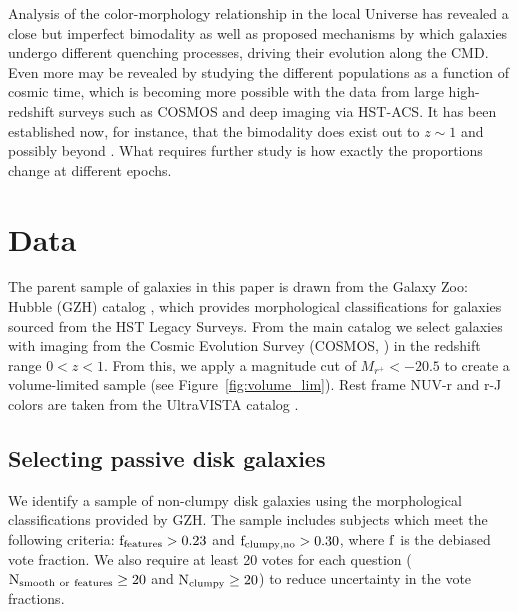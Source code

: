 \documentclass[useAMS,usenatbib]{mn2e}
\begin{document}
Analysis of the color-morphology relationship in the local Universe has revealed a close but imperfect bimodality as well as proposed mechanisms by which galaxies undergo different quenching processes, driving their evolution along the CMD. Even more may be revealed by studying the different populations as a function of cosmic time, which is becoming more possible with the data from large high-redshift surveys such as COSMOS and deep imaging via HST-ACS. It has been established now, for instance, that the bimodality does exist out to $z\sim1$ \citep{Bell2004,Cirasuolo2007,Mignoli2009} and possibly beyond \citep{Giallongo2005,VanDokkum2006,Franzetti2007,Cassata2008}. What requires further study is how exactly the proportions change at different epochs.


\section{Data}
\label{sec:Data}

The parent sample of galaxies in this paper is drawn from the Galaxy Zoo: Hubble (GZH) catalog \citep{Willett2016}, which provides morphological classifications for galaxies sourced from the HST Legacy Surveys. From the main catalog we select galaxies with imaging from the Cosmic Evolution Survey (COSMOS, \citet{Scoville2007}) in the redshift range $0<z<1$. From this, we apply a magnitude cut of $M_{r^{+}}<-20.5$ to create a volume-limited sample (see Figure~\ref{fig:volume_lim}). Rest frame NUV-r and r-J colors are taken from the UltraVISTA catalog \citep{McCracken2012,Ilbert2013}.

\subsection{Selecting passive disk galaxies}
\label{sec:sampleselection}
We identify a sample of non-clumpy disk galaxies using the morphological classifications provided by GZH. The sample includes subjects which meet the following criteria: $\rm f_{features} > 0.23$ and $\rm f_{clumpy,no} > 0.30$, where $\rm f$ is the debiased vote fraction. We also require at least 20 votes for each question ($\rm N_{smooth~or~features} \ge 20$ and $\rm N_{clumpy} \ge 20$) to reduce uncertainty in the vote fractions.
 
\end{document}
